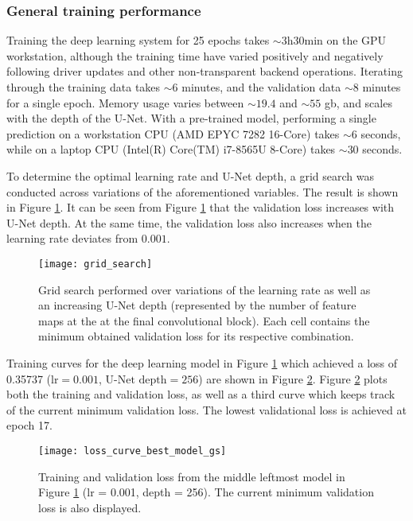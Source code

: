 \documentclass[../main/thesis]{subfiles}
\begin{document}
\subsubsection{General training performance}
Training the deep learning system for 25 epochs takes $\sim 3\text{h}30\text{min}$ on the GPU workstation, although the training time have varied positively and negatively following driver updates and other non-transparent backend operations. Iterating through the training data takes $\sim 6$ minutes, and the validation data $\sim 8$ minutes for a single epoch. Memory usage varies between $\sim19.4$ and $\sim55$ gb, and scales with the depth of the U-Net. With a pre-trained model, performing a single prediction on a workstation CPU (AMD EPYC 7282 16-Core) takes $\sim 6$ seconds, while on a laptop CPU (Intel(R) Core(TM) i7-8565U 8-Core) takes $\sim 30$ seconds.

To determine the optimal learning rate and U-Net depth, a grid search was conducted across variations of the aforementioned variables. The result is shown in Figure \ref{fig:gs}. It can be seen from Figure \ref{fig:gs} that the validation loss increases with U-Net depth. At the same time, the validation loss also increases when the learning rate deviates from $0.001$.

\begin{figure}
    \centering
    \texttt{[image: grid\_search]}
    \caption{\label{fig:gs}Grid search performed over variations of the learning rate as well as an increasing U-Net depth (represented by the number of feature maps at the at the final convolutional block). Each cell contains the minimum obtained validation loss for its respective combination.}
\end{figure}

Training curves for the deep learning model in Figure \ref{fig:gs} which achieved a loss of 0.35737 ($\text{lr} = 0.001$, $\text{U-Net depth} = 256$) are shown in Figure \ref{fig:loss_curve_from_gs}. Figure \ref{fig:loss_curve_from_gs} plots both the training and validation loss, as well as a third curve which keeps track of the current minimum validation loss. The lowest validational loss is achieved at epoch 17. 

\begin{figure}
    \centering
    \texttt{[image: loss\_curve\_best\_model\_gs]}
    \caption{\label{fig:loss_curve_from_gs}Training and validation loss from the middle leftmost model in Figure \ref{fig:gs} (lr = 0.001, depth = 256). The current minimum validation loss is also displayed.}
\end{figure}
\end{document}
